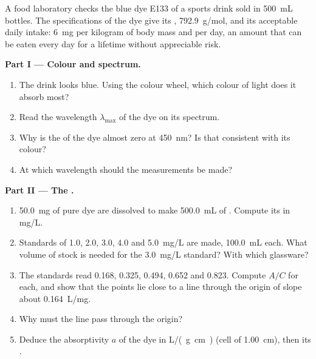 \begin{problem}
\label{pb:g11:absorbance:1}
A food laboratory checks the blue dye E133 of a sports drink sold in
\qty{500}{mL} bottles. The specifications of the dye give its ,
\qty{792.9}{g/mol}, and its acceptable daily intake: \qty{6}{mg} per
kilogram of body mass and per day, an amount that can be eaten every day
for a lifetime without appreciable risk.

\medskip
\noindent\textbf{Part I --- Colour and spectrum.}
\begin{enumerate}
  \item The drink looks blue. Using the colour wheel, which colour of
        light does it absorb most?
  \item Read the wavelength $\lambda_{\max}$ of the dye on its spectrum.
  \item Why is the  of the dye almost zero at \qty{450}{nm}?
        Is that consistent with its colour?
  \item At which wavelength should the measurements be made?
\end{enumerate}

\medskip
\noindent\textbf{Part II --- The .}
\begin{enumerate}[resume]
  \item \qty{50.0}{mg} of pure dye are dissolved to make \qty{500.0}{mL}
        of . Compute its  in \si{mg/L}.
  \item Standards of 1.0, 2.0, 3.0, 4.0 and \qty{5.0}{mg/L} are made,
        \qty{100.0}{mL} each. What volume of stock is needed for the
        \qty{3.0}{mg/L} standard? With which glassware?
  \item The standards read 0.168, 0.325, 0.494, 0.652 and 0.823. Compute
        $A / C$ for each, and show that the points lie close to a line
        through the origin of slope about \qty{0.164}{L/mg}.
  \item Why must the line pass through the origin?
  \item Deduce the absorptivity $a$ of the dye in \si{L/(g.cm)} (cell of
        \qty{1.00}{cm}), then its .
\end{enumerate}


\end{problem}
